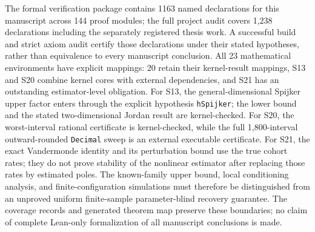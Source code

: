 \documentclass[12pt]{article}
\theoremstyle{definition}
\theoremstyle{remark}
\begin{document}
The formal verification package contains 1163 named declarations for this manuscript across 144 proof modules; the full project audit covers 1,238 declarations including the separately registered thesis work. A successful build and strict axiom audit certify those declarations under their stated hypotheses, rather than equivalence to every manuscript conclusion. All 23 mathematical environments have explicit mappings: 20 retain their kernel-result mappings, S13 and S20 combine kernel cores with external dependencies, and S21 has an outstanding estimator-level obligation. For S13, the general-dimensional Spijker upper factor enters through the explicit hypothesis \texttt{hSpijker}; the lower bound and the stated two-dimensional Jordan result are kernel-checked. For S20, the worst-interval rational certificate is kernel-checked, while the full 1,800-interval outward-rounded \texttt{Decimal} sweep is an external executable certificate. For S21, the exact Vandermonde identity and its perturbation bound use the true cohort rates; they do not prove stability of the nonlinear estimator after replacing those rates by estimated poles. The known-family upper bound, local conditioning analysis, and finite-configuration simulations must therefore be distinguished from an unproved uniform finite-sample parameter-blind recovery guarantee. The coverage records and generated theorem map preserve these boundaries; no claim of complete Lean-only formalization of all manuscript conclusions is made.
\end{document}
